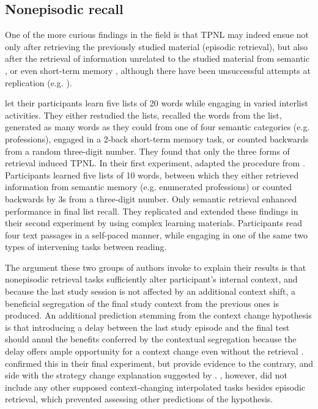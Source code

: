 \documentclass[../main.tex]{subfiles}
\begin{document}
\hypertarget{nonepisodic}{%
	\subsection{Nonepisodic recall}}

One of the more curious findings in the field is that TPNL may indeed 
ensue not only after retrieving the previously studied material (episodic 
retrieval), but also after the retrieval of information unrelated to the 
studied material from semantic \citep{divisRetrievalSpeedsContext2014, 
	pastotterRetrievalLearningFacilitates2011}, or even short-term memory 
	\citep{pastotterRetrievalLearningFacilitates2011}, although there have 
	been unsuccessful attempts at replication (e.g. 
\citealp{weinsteinNotAllRetrieval2015}). 

\cite{pastotterRetrievalLearningFacilitates2011} let their participants 
learn five lists of 20 words while engaging in varied interlist activities. 
They either restudied the lists, recalled the words from the list, generated 
as many words as they could from one of four semantic categories (e.g. 
professions), engaged in a 2-back short-term memory task, or counted 
backwards from a random three-digit number. They found that only the three 
forms of retrieval induced TPNL. In their first experiment, 
\cite{divisRetrievalSpeedsContext2014} adapted the procedure from 
\cite{pastotterRetrievalLearningFacilitates2011}. Participants learned five 
lists of 10 words, between which they either retrieved information from 
semantic memory (e.g. enumerated professions) or counted backwards by 3s 
from a three-digit number. Only semantic retrieval enhanced performance in 
final list recall. They replicated and extended these findings in their 
second experiment by using complex learning materials. Participants read 
four text passages in a self-paced manner, while engaging in one of the same 
two types of intervening tasks between reading. 

The argument these two groups of authors invoke to explain their results is 
that nonepisodic retrieval tasks sufficiently alter participant's internal 
context, and because the last study session is not affected by an additional 
context shift, a beneficial segregation of the final study context from the 
previous ones is produced. An additional prediction stemming from the 
context change hypothesis is that introducing a delay between the last study 
episode and the final test should annul the benefits conferred by the 
contextual segregation because the delay offers ample opportunity for a 
context change even without the retrieval 
\citep{chanRetrievalPotentiatesNew2018}. 
\cite{divisRetrievalSpeedsContext2014} confirmed this in their final 
experiment, but \cite{chanTestingPotentiatesNew2018} provide evidence to the 
contrary, and side with the strategy change explanation suggested by 
\cite{wissmanInterimTestEffect2011}. \cite{chanTestingPotentiatesNew2018}, 
however, did not include any other supposed context-changing interpolated 
tasks besides episodic retrieval, which prevented assessing other 
predictions of the hypothesis. 
\end{document}
